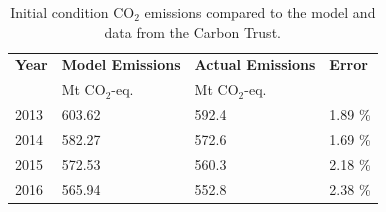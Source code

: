 \begin{table}[!ht]
	\caption{Initial condition CO$_2$ emissions compared to the model and data from the Carbon Trust\cite{carbon_brief_carbon_2018}.}
	\vspace{0.1in}
	\begin{tabularx}{\textwidth}{p{} p{} p{} p{}}
		\hline
\textbf{Year} & \textbf{Model Emissions} & \textbf{Actual Emissions} & \textbf{Error} \\
  & Mt CO$_2$-eq. & Mt CO$_2$-eq. &  \\
\hline
2013 & 603.62 & 592.4 & 1.89 \% \\
2014 & 582.27 & 572.6 & 1.69 \% \\
2015 & 572.53 & 560.3 & 2.18 \% \\
2016 & 565.94 & 552.8 & 2.38 \% \\
\hline 
	\end{tabularx}
\label{ic-co2}
\end{table}

